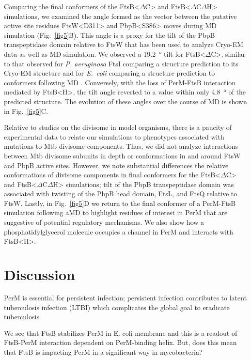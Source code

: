 \documentclass[twocolumn,pdflatex,sn-nature]{sn-jnl}%
\def\textsuperscript#1{<#1>}%
\newcommand\ec{\textit{E.~coli}}
\newcommand\mtb{Mtb}
\newcommand\pa{\textit{P. aeruginosa}}
\newcommand\ftsbH{FtsB\textsuperscript{H}}
\newcommand\ftsbdCdH{FtsB\textsuperscript{$\Delta{}$C$\Delta{}$H}}
\newcommand\ftsbdC{FtsB\textsuperscript{$\Delta{}$C}}
\begin{document}
Comparing the final conformers of the \ftsbdC{} and \ftsbdCdH{} simulations, we examined the angle formed as the vector between the putative active site residues FtsW\textsuperscript{D311} and PbpB\textsuperscript{S386} moves during MD simulation (Fig.~\ref{fig5}B).
This angle is a proxy for the tilt of the PbpB transpeptidase domain relative to FtsW that has been used to analyze Cryo-EM data as well as MD simulation.
We observed a \qty{19.2}{\degree} tilt for \ftsbdC{}, similar to that observed for \pa{} FtsI comparing a structure prediction to its Cryo-EM structure \citep{kashammerCryoEMStructureBacterial2023} and for \ec{} comparing a structure prediction to conformers following MD \citep{brittonConformationalChangesEssential2023}.
Conversely, with the loss of PerM-FtsB interaction mediated by \ftsbH{}, the tilt angle reverted to a value within only \qty{4.8}{\degree} of the predicted structure.
The evolution of these angles over the course of MD is shown in Fig.~\ref{fig5}C.

Relative to studies on the divisome in model organisms, there is a paucity of experimental data to relate our simulations to phenotypes associated with mutations to \mtb{} divisome components.
Thus, we did not analyze interactions between \mtb{} divisome subunits in depth or conformations in and around FtsW and PbpB active sites.
However, we note substantial differences the relative conformations of divisome components in final conformers for the \ftsbdC{} and \ftsbdCdH{} simulations; tilt of the PbpB transpeptidase domain was associated with twisting of the PbpB head domain, FtsL, and FtsQ relative to FtsW.
Lastly, in Fig.~\ref{fig5}D we return to the final conformer of a PerM-FtsB simulation following aMD to highlight residues of interest in PerM that are suggestive of potential regulatory mechanisms.
We also show how a phosphatidylglycerol molecule occupies a channel in PerM and interacts with \ftsbH{}.

\section{Discussion}

PerM is essential for persistent infection; persistent infection contributes to latent tuberculosis infection (LTBI) which complicates the global goal to eradicate tuberculosis

We see that FtsB stabilizes PerM in E. coli membrane and this is a readout of FtsB-PerM interaction dependent on PerM-binding helix. But, does this mean that FtsB is impacting PerM in a significant way in mycobacteria?
\end{document}
